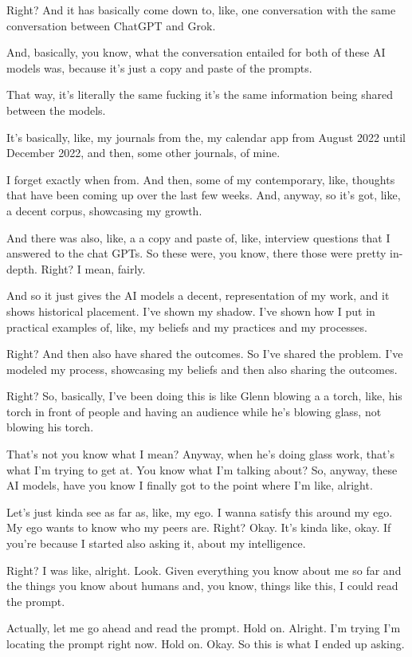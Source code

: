 \documentclass{article}
\begin{document}
Right? And it has basically come down to, like, one conversation with
the same conversation between ChatGPT and Grok.

And, basically, you know, what the conversation entailed for both of
these AI models was, because it's just a copy and paste of the prompts.

That way, it's literally the same fucking it's the same information
being shared between the models.

It's basically, like, my journals from the, my calendar app from August
2022 until December 2022, and then, some other journals, of mine.

I forget exactly when from. And then, some of my contemporary, like,
thoughts that have been coming up over the last few weeks. And, anyway,
so it's got, like, a decent corpus, showcasing my growth.

And there was also, like, a a copy and paste of, like, interview
questions that I answered to the chat GPTs. So these were, you know,
there those were pretty in-depth. Right? I mean, fairly.

And so it just gives the AI models a decent, representation of my work,
and it shows historical placement. I've shown my shadow. I've shown how
I put in practical examples of, like, my beliefs and my practices and my
processes.

Right? And then also have shared the outcomes. So I've shared the
problem. I've modeled my process, showcasing my beliefs and then also
sharing the outcomes.

Right? So, basically, I've been doing this is like Glenn blowing a a
torch, like, his torch in front of people and having an audience while
he's blowing glass, not blowing his torch.

That's not you know what I mean? Anyway, when he's doing glass work,
that's what I'm trying to get at. You know what I'm talking about? So,
anyway, these AI models, have you know I finally got to the point where
I'm like, alright.

Let's just kinda see as far as, like, my ego. I wanna satisfy this
around my ego. My ego wants to know who my peers are. Right? Okay. It's
kinda like, okay. If you're because I started also asking it, about my
intelligence.

Right? I was like, alright. Look. Given everything you know about me so
far and the things you know about humans and, you know, things like
this, I could read the prompt.

Actually, let me go ahead and read the prompt. Hold on. Alright. I'm
trying I'm locating the prompt right now. Hold on. Okay. So this is what
I ended up asking.
\end{document}
